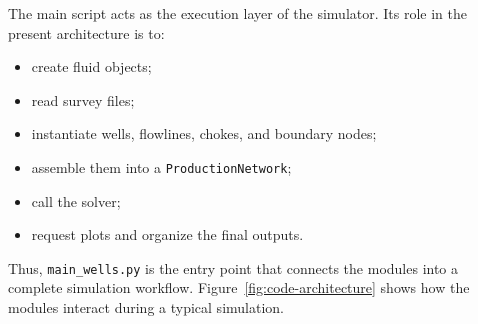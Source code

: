 The main script acts as the execution layer of the simulator. Its role in the
present architecture is to:

\begin{itemize}
    \item create fluid objects;
    \item read survey files;
    \item instantiate wells, flowlines, chokes, and boundary nodes;
    \item assemble them into a \texttt{ProductionNetwork};
    \item call the solver;
    \item request plots and organize the final outputs.
\end{itemize}

Thus, \texttt{main\_wells.py} is the entry point that connects the modules into
a complete simulation workflow. Figure~\ref{fig:code-architecture} shows how the
modules interact during a typical simulation.

